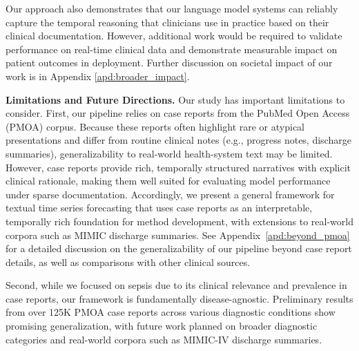 \documentclass[letterpaper]{article} %
\begin{document}
Our approach also demonstrates that our language model systems can reliably capture the temporal reasoning that clinicians use in practice based on their clinical documentation. However, additional work would be required to validate performance on real-time clinical data and demonstrate measurable impact on patient outcomes in deployment. Further discussion on societal impact of our work is in Appendix \ref{apd:broader_impact}.

\textbf{Limitations and Future Directions.} 
Our study has important limitations to consider. First, our pipeline relies on case reports from the PubMed Open Access (PMOA) corpus. Because these reports often highlight rare or atypical presentations and differ from routine clinical notes (e.g., progress notes, discharge summaries), generalizability to real-world health-system text may be limited. However, case reports provide rich, temporally structured narratives with explicit clinical rationale, making them well suited for evaluating model performance under sparse documentation. Accordingly, we present a general framework for textual time series forecasting that uses case reports as an interpretable, temporally rich foundation for method development, with extensions to real-world corpora such as MIMIC discharge summaries. See Appendix~\ref{apd:beyond_pmoa} for a detailed discussion on the generalizability of our pipeline beyond case report details, as well as comparisons with other clinical sources.

Second, while we focused on sepsis due to its clinical relevance and prevalence in case reports, our framework is fundamentally disease-agnostic. Preliminary results from over 125K PMOA case reports across various diagnostic conditions show promising generalization, with future work planned on broader diagnostic categories and real-world corpora such as MIMIC-IV discharge summaries.
\end{document}
